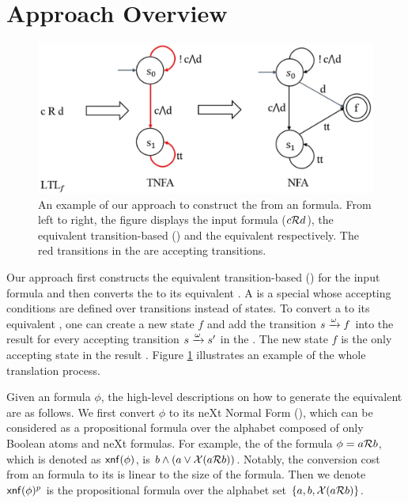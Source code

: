 \section{Approach Overview} \label{sec:overview}

\begin{figure}
\centering
  \includegraphics[scale=0.4]{overview.pdf}
  \caption{An example of our approach to construct the \NFA from an \ltlf formula. From left to right, the figure displays the input formula ($c\mathcal{R} d$), the equivalent transition-based \NFA (\TNFA) and the equivalent \NFA respectively. The red transitions in the \TNFA are accepting transitions.}
  \label{fig:overview}
\end{figure}

Our approach first constructs the equivalent transition-based \NFA (\TNFA) for the input formula and then converts the \TNFA to its equivalent \NFA. A \TNFA is a special \NFA whose accepting conditions are defined over transitions instead of states. To convert a \TNFA to its equivalent \NFA, one can create a new state $f$ and add the transition $s\xrightarrow[]{\omega}f$ into the result \NFA for every accepting transition $s\xrightarrow[]{\omega}s'$ in the \TNFA. The new state $f$ is the only accepting state in the result \NFA. Figure \ref{fig:overview} illustrates an example of the whole translation process. 

Given an \ltlf formula $\phi$, the high-level descriptions on how to generate the equivalent \TNFA are as follows. We first convert $\phi$ to its neXt Normal Form (\XNF), which can be considered as a propositional formula over the alphabet composed of only Boolean atoms and neXt formulas. For example, the \XNF of the formula $\phi=a\mathcal{R} b$, which is denoted as ${\sf xnf}(\phi)$, is $b\wedge (a\vee \mathcal{X}(a\mathcal{R} b))$. Notably, the conversion cost from an \ltlf formula to its \XNF is linear to the size of the formula. Then we denote ${\sf xnf}(\phi)^p$ is the propositional formula over the alphabet set $\{a, b, \mathcal{X}(a\mathcal{R} b)\}$.

